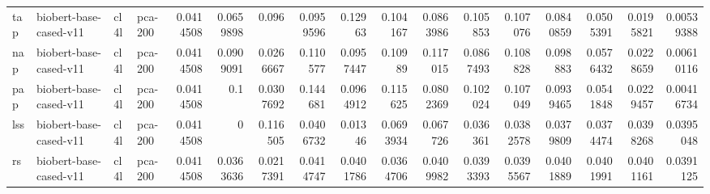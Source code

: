 \begin{tabular}{llllrrrrrrrrrrrrr}
 tap         & biobert-base-cased-v11 & cl4l             & pca-200               &        0.0414508 &        0.0659898 &        0.096     &        0.0959596 &        0.12963   &        0.104167  &        0.0863986 &        0.105853  &        0.107076  &        0.0840859 &         0.0505391 &         0.0195821 &        0.00539388 \\
 nap         & biobert-base-cased-v11 & cl4l             & pca-200               &        0.0414508 &        0.0909091 &        0.0266667 &        0.110577  &        0.0957447 &        0.10989   &        0.117015  &        0.0867493 &        0.108828  &        0.098883  &         0.0576432 &         0.0228659 &        0.00610116 \\
 pap         & biobert-base-cased-v11 & cl4l             & pca-200               &        0.0414508 &        0.1       &        0.0307692 &        0.144681  &        0.0964912 &        0.115625  &        0.0802369 &        0.102024  &        0.107049  &        0.0939465 &         0.0541848 &         0.0229457 &        0.00416734 \\
 lss         & biobert-base-cased-v11 & cl4l             & pca-200               &        0.0414508 &        0         &        0.116505  &        0.0406732 &        0.01346   &        0.0693934 &        0.067726  &        0.036361  &        0.0382578 &        0.0379809 &         0.0374474 &         0.0398268 &        0.0395048  \\
 rs          & biobert-base-cased-v11 & cl4l             & pca-200               &        0.0414508 &        0.0363636 &        0.0217391 &        0.0414747 &        0.0401786 &        0.0364706 &        0.0409982 &        0.0393393 &        0.0395567 &        0.0401889 &         0.0401991 &         0.0401161 &        0.0391125  \\
\hline
\end{tabular}